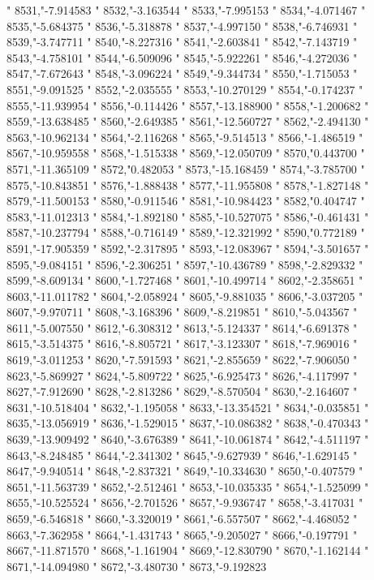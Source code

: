 "
8531,"-7.914583
"
8532,"-3.163544
"
8533,"-7.995153
"
8534,"-4.071467
"
8535,"-5.684375
"
8536,"-5.318878
"
8537,"-4.997150
"
8538,"-6.746931
"
8539,"-3.747711
"
8540,"-8.227316
"
8541,"-2.603841
"
8542,"-7.143719
"
8543,"-4.758101
"
8544,"-6.509096
"
8545,"-5.922261
"
8546,"-4.272036
"
8547,"-7.672643
"
8548,"-3.096224
"
8549,"-9.344734
"
8550,"-1.715053
"
8551,"-9.091525
"
8552,"-2.035555
"
8553,"-10.270129
"
8554,"-0.174237
"
8555,"-11.939954
"
8556,"-0.114426
"
8557,"-13.188900
"
8558,"-1.200682
"
8559,"-13.638485
"
8560,"-2.649385
"
8561,"-12.560727
"
8562,"-2.494130
"
8563,"-10.962134
"
8564,"-2.116268
"
8565,"-9.514513
"
8566,"-1.486519
"
8567,"-10.959558
"
8568,"-1.515338
"
8569,"-12.050709
"
8570,"0.443700
"
8571,"-11.365109
"
8572,"0.482053
"
8573,"-15.168459
"
8574,"-3.785700
"
8575,"-10.843851
"
8576,"-1.888438
"
8577,"-11.955808
"
8578,"-1.827148
"
8579,"-11.500153
"
8580,"-0.911546
"
8581,"-10.984423
"
8582,"0.404747
"
8583,"-11.012313
"
8584,"-1.892180
"
8585,"-10.527075
"
8586,"-0.461431
"
8587,"-10.237794
"
8588,"-0.716149
"
8589,"-12.321992
"
8590,"0.772189
"
8591,"-17.905359
"
8592,"-2.317895
"
8593,"-12.083967
"
8594,"-3.501657
"
8595,"-9.084151
"
8596,"-2.306251
"
8597,"-10.436789
"
8598,"-2.829332
"
8599,"-8.609134
"
8600,"-1.727468
"
8601,"-10.499714
"
8602,"-2.358651
"
8603,"-11.011782
"
8604,"-2.058924
"
8605,"-9.881035
"
8606,"-3.037205
"
8607,"-9.970711
"
8608,"-3.168396
"
8609,"-8.219851
"
8610,"-5.043567
"
8611,"-5.007550
"
8612,"-6.308312
"
8613,"-5.124337
"
8614,"-6.691378
"
8615,"-3.514375
"
8616,"-8.805721
"
8617,"-3.123307
"
8618,"-7.969016
"
8619,"-3.011253
"
8620,"-7.591593
"
8621,"-2.855659
"
8622,"-7.906050
"
8623,"-5.869927
"
8624,"-5.809722
"
8625,"-6.925473
"
8626,"-4.117997
"
8627,"-7.912690
"
8628,"-2.813286
"
8629,"-8.570504
"
8630,"-2.164607
"
8631,"-10.518404
"
8632,"-1.195058
"
8633,"-13.354521
"
8634,"-0.035851
"
8635,"-13.056919
"
8636,"-1.529015
"
8637,"-10.086382
"
8638,"-0.470343
"
8639,"-13.909492
"
8640,"-3.676389
"
8641,"-10.061874
"
8642,"-4.511197
"
8643,"-8.248485
"
8644,"-2.341302
"
8645,"-9.627939
"
8646,"-1.629145
"
8647,"-9.940514
"
8648,"-2.837321
"
8649,"-10.334630
"
8650,"-0.407579
"
8651,"-11.563739
"
8652,"-2.512461
"
8653,"-10.035335
"
8654,"-1.525099
"
8655,"-10.525524
"
8656,"-2.701526
"
8657,"-9.936747
"
8658,"-3.417031
"
8659,"-6.546818
"
8660,"-3.320019
"
8661,"-6.557507
"
8662,"-4.468052
"
8663,"-7.362958
"
8664,"-1.431743
"
8665,"-9.205027
"
8666,"-0.197791
"
8667,"-11.871570
"
8668,"-1.161904
"
8669,"-12.830790
"
8670,"-1.162144
"
8671,"-14.094980
"
8672,"-3.480730
"
8673,"-9.192823

